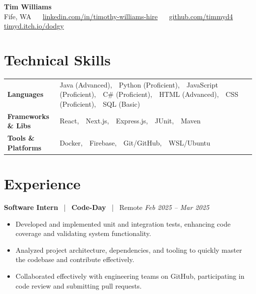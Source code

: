 \documentclass[10pt, letterpaper]{article}
\newcommand{\jobhead}[4]{%
  \vspace{5pt}%
  {\bfseries\color{dark}#1}%
  ~{\color{light}|}~%
  {\bfseries\color{navy}#2}%
  ~{\color{light}|}~%
  {\color{light}#3}%
  \hfill{\color{light}\small\textit{#4}}\\[-2pt]%
}
\newcommand{\skillrow}[2]{%
  {\bfseries #1} & #2 \\[2pt]%
}
\begin{document}

\begin{center}
  {\huge\bfseries\color{navy} Tim Williams}\\[4pt]
  {\small\color{light}
    Fife, WA
    ~\textbullet~
    \href{https://linkedin.com/in/timothy-williams-hire}{linkedin.com/in/timothy-williams-hire}
    ~\textbullet~
    \href{https://github.com/timmyd4}{github.com/timmyd4}
    ~\textbullet~
    \href{https://timyd.itch.io/dodgy}{timyd.itch.io/dodgy}
  }
\end{center}

\vspace{2pt}

\section{Technical Skills}

\begin{tabular}{@{}p{1.6in} p{5.2in}@{}}
  \skillrow{Languages}{Java (Advanced),\ \ Python (Proficient),\ \ JavaScript (Proficient),\ \ C\# (Proficient),\ \ HTML (Advanced),\ \ CSS (Proficient),\ \ SQL (Basic)}
  \skillrow{Frameworks \& Libs}{React,\ \ Next.js,\ \ Express.js,\ \ JUnit,\ \ Maven}
  \skillrow{Tools \& Platforms}{Docker,\ \ Firebase,\ \ Git/GitHub,\ \ WSL/Ubuntu}
\end{tabular}

\section{Experience}

\jobhead{Software Intern}{Code-Day}{Remote}{Feb 2025 – Mar 2025}
\begin{itemize}
  \item Developed and implemented unit and integration tests, enhancing code coverage and validating system functionality.
  \item Analyzed project architecture, dependencies, and tooling to quickly master the codebase and contribute effectively.
  \item Collaborated effectively with engineering teams on GitHub, participating in code review and submitting pull requests.
\end{itemize}
\end{document}
